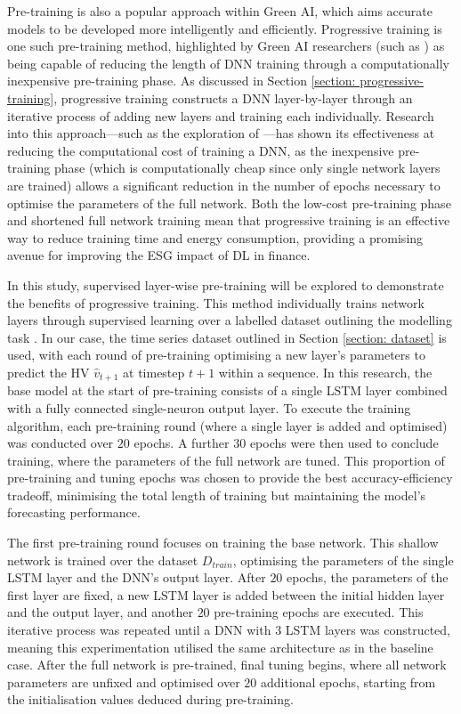 \documentclass[a4paper, 11pt]{report}
\begin{document}
    Pre-training is also a popular approach within Green AI, which aims accurate models to be developed more intelligently and efficiently. Progressive training is one such pre-training method, highlighted by Green AI researchers (such as \citet{xu-2021}) as being capable of reducing the length of DNN training through a computationally inexpensive pre-training phase. As discussed in Section \ref{section: progressive-training}, progressive training constructs a DNN layer-by-layer through an iterative process of adding new layers and training each individually. Research into this approach---such as the exploration of \citet{ienco-2019}---has shown its effectiveness at reducing the computational cost of training a DNN, as the inexpensive pre-training phase (which is computationally cheap since only single network layers are trained) allows a significant reduction in the number of epochs necessary to optimise the parameters of the full network. Both the low-cost pre-training phase and shortened full network training mean that progressive training is an effective way to reduce training time and energy consumption, providing a promising avenue for improving the ESG impact of DL in finance.

    In this study, supervised layer-wise pre-training will be explored to demonstrate the benefits of progressive training. This method individually trains network layers through supervised learning over a labelled dataset outlining the modelling task \citep{ienco-2019}. In our case, the time series dataset outlined in Section \ref{section: dataset} is used, with each round of pre-training optimising a new layer's parameters to predict the HV $\hat{v}_{t+1}$ at timestep $t+1$ within a sequence. In this research, the base model at the start of pre-training consists of a single LSTM layer combined with a fully connected single-neuron output layer. To execute the training algorithm, each pre-training round (where a single layer is added and optimised) was conducted over $20$ epochs. A further $30$ epochs were then used to conclude training, where the parameters of the full network are tuned. This proportion of pre-training and tuning epochs was chosen  to provide the best accuracy-efficiency tradeoff, minimising the total length of training but maintaining the model's forecasting performance. 

    The first pre-training round focuses on training the base network. This shallow network is trained over the dataset $D_{train}$, optimising the parameters of the single LSTM layer and the DNN's output layer. After $20$ epochs, the parameters of the first layer are fixed, a new LSTM layer is added between the initial hidden layer and the output layer, and another $20$ pre-training epochs are executed. This iterative process was repeated until a DNN with $3$ LSTM layers was constructed, meaning this experimentation utilised the same architecture as in the baseline case. After the full network is pre-trained, final tuning begins, where all network parameters are unfixed and optimised over $20$ additional epochs, starting from the initialisation values deduced during pre-training.
\end{document}
